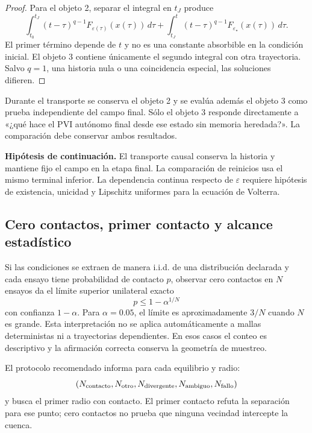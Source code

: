 \begin{proof}
Para el objeto 2, separar el integral en \(t_J\) produce
\[
 \int_{t_0}^{t_J}(t-\tau)^{q-1}
 F_{\varepsilon(\tau)}(x(\tau))\,d\tau
 +\int_{t_J}^{t}(t-\tau)^{q-1}
 F_{\varepsilon_\star}(x(\tau))\,d\tau.
\]
El primer término depende de \(t\) y no es una constante absorbible en la
condición inicial. El objeto 3 contiene únicamente el segundo integral con
otra trayectoria. Salvo \(q=1\), una historia nula o una coincidencia
especial, las soluciones difieren.
\end{proof}

Durante el transporte se conserva el objeto 2 y se
evalúa además el objeto 3 como prueba independiente del campo final. Sólo el
objeto 3 responde directamente a «¿qué hace el PVI autónomo final desde ese
estado sin memoria heredada?». La comparación debe conservar ambos resultados.

\begin{proposalbox}
\textbf{Hipótesis de continuación.} El transporte causal conserva la historia
y mantiene fijo el campo en la etapa final. La comparación de reinicios usa
el mismo terminal inferior. La dependencia continua respecto de
\(\varepsilon\) requiere hipótesis de existencia, unicidad y Lipschitz
uniformes para la ecuación de Volterra.
\end{proposalbox}

\ifHAFOBasinMaterial
\subsection{Cero contactos, primer contacto y alcance estadístico}
\label{sec:zero-contact}

Si las condiciones se extraen de manera i.i.d. de una distribución declarada
y cada ensayo tiene probabilidad de contacto \(p\), observar cero contactos en
\(N\) ensayos da el límite superior unilateral exacto
\begin{equation}
 p\leq1-\alpha^{1/N}
 \label{eq:th-binomial-upper}
\end{equation}
con confianza \(1-\alpha\). Para \(\alpha=0.05\), el límite es aproximadamente
\(3/N\) cuando \(N\) es grande. Esta interpretación no se aplica
automáticamente a mallas deterministas ni a trayectorias dependientes. En esos
casos el conteo es descriptivo y la afirmación correcta conserva la geometría
de muestreo.

El protocolo recomendado informa para cada equilibrio y radio:
\[
 (N_{\rm contacto},N_{\rm otro},N_{\rm divergente},
 N_{\rm ambiguo},N_{\rm fallo})
\]
y busca el primer radio con contacto. El primer contacto refuta la separación
para ese punto; cero contactos no prueba que ninguna vecindad intercepte la
cuenca.
\fi

